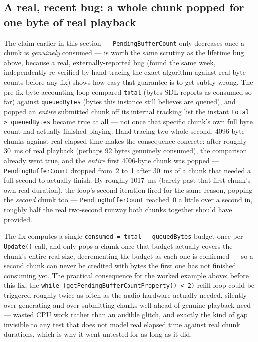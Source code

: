 \subsection{A real, recent bug: a whole chunk popped for one byte of real playback}

The claim earlier in this section --- \texttt{PendingBufferCount} only decreases once a chunk
is \emph{genuinely} consumed --- is worth the same scrutiny as the  lifetime bug
above, because a real, externally-reported bug (found the same week, independently
re-verified by hand-tracing the exact algorithm against real byte counts before any fix) shows
how easy that guarantee is to get subtly wrong. The pre-fix byte-accounting loop compared
\texttt{total} (bytes SDL reports as consumed so far) against \texttt{queuedBytes} (bytes this
instance still believes are queued), and popped an \emph{entire} submitted chunk off its
internal tracking list the instant \texttt{total > queuedBytes} became true at all --- not once
that specific chunk's own full byte count had actually finished playing. Hand-tracing two
whole-second, 4096-byte chunks against real elapsed time makes the consequence concrete: after
roughly 30~ms of real playback (perhaps 92 bytes genuinely consumed), the comparison already
went true, and the \emph{entire} first 4096-byte chunk was popped --- \texttt{PendingBufferCount}
dropped from~2 to~1 after 30~ms of a chunk that needed a full second to actually finish. By
roughly 1017~ms (barely past that first chunk's own real duration), the loop's second iteration
fired for the same reason, popping the \emph{second} chunk too --- \texttt{PendingBufferCount}
reached~0 a little over a second in, roughly half the real two-second runway both chunks
together should have provided.

The fix computes a single \texttt{consumed = total - queuedBytes} budget once per
\texttt{Update()} call, and only pops a chunk once that budget actually covers the chunk's
entire real size, decrementing the budget as each one is confirmed --- so a second chunk can
never be credited with bytes the first one has not finished consuming yet. The practical
consequence for the worked example above: before this fix, the \texttt{while
(getPendingBufferCountProperty() < 2)} refill loop could be triggered roughly twice as often as
the audio hardware actually needed, silently over-generating and over-submitting chunks well
ahead of genuine playback need --- wasted CPU work rather than an audible glitch, and exactly
the kind of gap invisible to any test that does not model real elapsed time against real chunk
durations, which is why it went untested for as long as it did.

